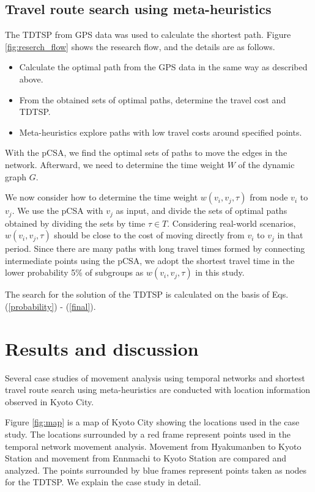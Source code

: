 \documentclass[conference]{IEEEtran}
\begin{document}
\subsection{Travel route search using meta-heuristics}
\par The TDTSP from GPS data was used to calculate the shortest path.
Figure \ref{fig:reserch_flow} shows the research flow, and the details are as follows.

\begin{itemize}
 \item Calculate the optimal path from the GPS data in the same way as described above.
 \item From the obtained sets of optimal paths, determine the travel cost and TDTSP.
 \item Meta-heuristics explore paths with low travel costs around specified points.
\end{itemize}

\par With the pCSA, we find the optimal sets of paths to move the edges in the network.
Afterward, we need to determine the time weight $W$ of the dynamic graph $G$.
\par We now consider how to determine the time weight $w(v_i,v_j,\tau)$ from node $v_i$ to $v_j$.
We use the pCSA with $v_j$ as input, and divide the sets of optimal paths obtained by dividing the sets by time $\tau \in T$.
Considering real-world scenarios, $w(v_i,v_j,\tau)$ should be close to the cost of moving directly from $v_i$ to $v_j$ in that period.
Since there are many paths with long travel times formed by connecting intermediate points using the pCSA, we adopt the shortest travel time in the lower probability 5\% of subgroups as $w(v_i,v_j,\tau)$ in this study.
\par The search for the solution of the TDTSP is calculated on the basis of Eqs. (\ref{probability}) - (\ref{final}).

\section{Results and discussion}
\label{sec:results}
\par Several case studies of movement analysis using temporal networks and shortest travel route search using meta-heuristics are conducted with location information observed in Kyoto City.

\par Figure \ref{fig:map} is a map of Kyoto City showing the locations used in the case study.
The locations surrounded by a red frame represent points used in the temporal network movement analysis.
Movement from Hyakumanben to Kyoto Station and movement from Ennmachi to Kyoto Station are compared and analyzed.
The points surrounded by blue frames represent points taken as nodes for the TDTSP.
We explain the case study in detail.
\end{document}
